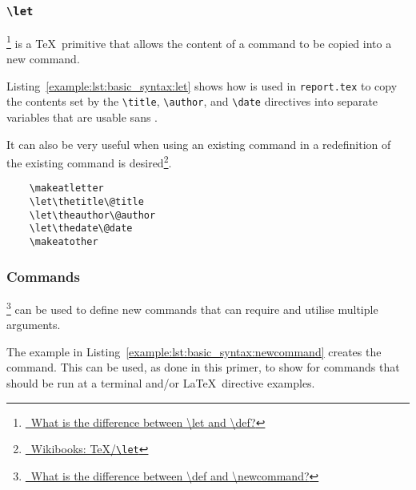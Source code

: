 \subsubsection{\texttt{\textbackslash let}}
\footnote{\href{https://tex.stackexchange.com/questions/258/what-is-the-difference-between-let-and-def}{\faStackExchange\ What is the difference between \textbackslash let and \textbackslash def?}} is a \TeX\ primitive that allows the content of a command to be copied into a new command.

Listing~\ref{example:lst:basic_syntax:let} shows how  is used in \texttt{report.tex} to copy the contents set by the \texttt{\textbackslash title}, \texttt{\textbackslash author}, and \texttt{\textbackslash date} directives into separate variables that are usable sans .

It can also be very useful when using an existing command in a redefinition of the existing command is desired\footnote{\href{https://en.wikibooks.org/wiki/TeX/let}{\faBook\ Wikibooks: \TeX{}/\texttt{\textbackslash let}}}.

\begin{listing}[H]
  \captionsetup{skip=\skiplistingcaptionlen}
  \begin{verbatim}
    \makeatletter
    \let\thetitle\@title
    \let\theauthor\@author
    \let\thedate\@date
    \makeatother
  \end{verbatim}
  \caption{\texttt{\textbackslash let} command example}
  \label{example:lst:basic_syntax:let}
\end{listing}

\pagebreak
\subsubsection{Commands}
\footnote{\href{https://tex.stackexchange.com/questions/655/what-is-the-difference-between-def-and-newcommand}{\faStackExchange\ What is the difference between \textbackslash def and \textbackslash newcommand?}} can be used to define new commands that can require and utilise multiple arguments.

The example in Listing~\ref{example:lst:basic_syntax:newcommand} creates the  command. This can be used, as done in this primer, to show  for commands that should be run at a terminal and/or \LaTeX\ directive examples.

